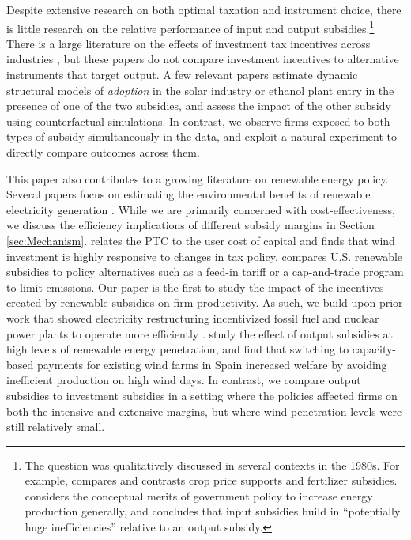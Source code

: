 \documentclass[12pt]{article}
\begin{document}
Despite extensive research on both optimal taxation and instrument choice, there is little research on the relative performance of input and output subsidies.\footnote{The question was qualitatively discussed in several contexts in the 1980s. For example, \cite{stiglizWB1987} compares and contrasts crop price supports and fertilizer subsidies. \citet{schmalensee_appropriate_1980} considers the conceptual merits of government policy to increase energy production generally, and concludes that input subsidies build in ``potentially huge inefficiencies'' relative to an output subsidy.} There is a large literature on the effects of investment tax incentives across industries \citep[e.g.,][]{goolsbee_investment_1998,goolsbee_taxes_2004,house_temporary_2008}, but these papers do not compare investment incentives to alternative instruments that target output. A few relevant papers estimate dynamic structural models of \textit{adoption} in the solar industry \citep{burr2016subsidies,de_groote_subsidies_2019} or ethanol plant entry \citep{yi2018dynamic} in the presence of one of the two subsidies, and assess the impact of the other subsidy using counterfactual simulations. In contrast, we observe firms exposed to both types of subsidy simultaneously in the data, and exploit a natural experiment to directly compare outcomes across them. 

This paper also contributes to a growing literature on renewable energy policy. Several papers focus on estimating the environmental benefits of renewable electricity generation \citep[e.g.,][]{cullen_measuring_2013,novan_valuing_2015,callaway_location_2018,fell_emissions_2021}. While we are primarily concerned with cost-effectiveness, we discuss the efficiency implications of different subsidy margins in Section \ref{sec:Mechanism}. \citet{metcalf_investment_2010} relates the PTC to the user cost of capital and finds that wind investment is highly responsive to changes in tax policy. \citet{schmalensee_evaluating_2012} compares U.S. renewable subsidies to policy alternatives such as a feed-in tariff or a cap-and-trade program to limit emissions. Our paper is the first to study the impact of the incentives created by renewable subsidies on firm productivity. As such, we build upon prior work that showed electricity restructuring incentivized fossil fuel and nuclear power plants to operate more efficiently \citep[e.g.,][]{fabrizio_markets_2007,davis_deregulation_2012,cicala_when_2015}. \citet{petersen2021Spain} study the effect of output subsidies at high levels of renewable energy penetration, and find that switching to capacity-based payments for existing wind farms in Spain increased welfare by avoiding inefficient production on high wind days. In contrast, we compare output subsidies to investment subsidies in a setting where the policies affected firms on both the intensive and extensive margins, but where wind penetration levels were still relatively small. 
\end{document}
